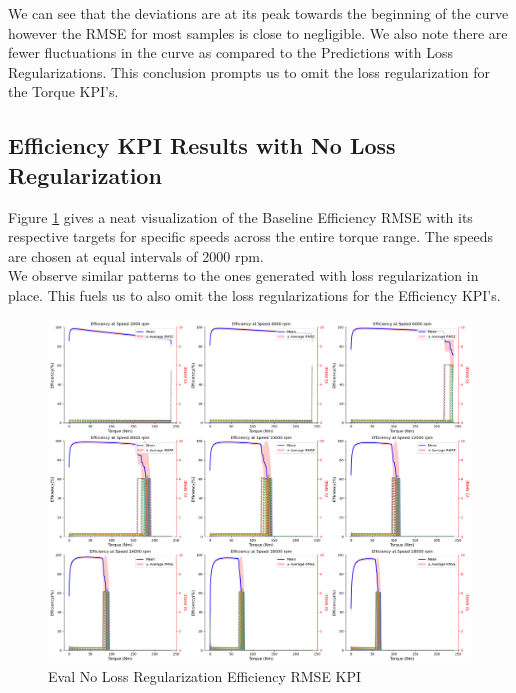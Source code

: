 \documentclass{report} %
\begin{document}
We can see that the deviations are at its peak towards the beginning of the curve however the \ac{RMSE} for most samples is close to negligible.
We also note there are fewer fluctuations in the curve as compared to the Predictions with Loss Regularizations.
This conclusion prompts us to omit the loss regularization for the Torque \ac{KPI}'s.\\

\subsection{Efficiency \ac{KPI} Results with No Loss Regularization}\label{subsec:3D Efficiency Results with No Loss Regularization}

Figure \ref{fig:Eval No Loss Regularization Efficiency RMSE KPI} gives a neat visualization of the Baseline Efficiency \ac{RMSE} with its respective targets for specific speeds across the entire torque range.
The speeds are chosen at equal intervals of 2000 rpm.\\
We observe similar patterns to the ones generated with loss regularization in place.
This fuels us to also omit the loss regularizations for the Efficiency \ac{KPI}'s.\\
\begin{figure}[H]
    \centering
    \includegraphics[width=1\textwidth]{./ReportImages/rmse_eta_no_lossreg_MLP.png} 
    \caption{Eval No Loss Regularization Efficiency \ac{RMSE} \ac{KPI}} 
    \label{fig:Eval No Loss Regularization Efficiency RMSE KPI}
\end{figure}
\end{document}
